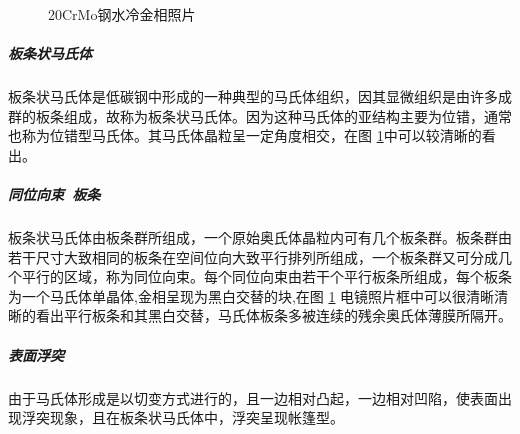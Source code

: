 \documentclass[12pt]{ctexart}
\begin{document}
\begin{figure}[h]
  \centering
  \caption{20CrMo钢水冷金相照片}
  \label{20water}
\end{figure}
\subparagraph{板条状马氏体}
板条状马氏体是低碳钢中形成的一种典型的马氏体组织，因其显微组织是由许多成群的板条组成，故称为板条状马氏体。因为这种马氏体的亚结构主要为位错，通常也称为位错型马氏体。其马氏体晶粒呈一定角度相交，在图 \ref{20water}中可以较清晰的看出。
\subparagraph{同位向束\  板条}
板条状马氏体由板条群所组成，一个原始奥氏体晶粒内可有几个板条群。板条群由若干尺寸大致相同的板条在空间位向大致平行排列所组成，一个板条群又可分成几个平行的区域，称为同位向束。每个同位向束由若干个平行板条所组成，每个板条为一个马氏体单晶体,金相呈现为黑白交替的块,在图 \ref{20water} 电镜照片框中可以很清晰清晰的看出平行板条和其黑白交替，马氏体板条多被连续的残余奥氏体薄膜所隔开。
\subparagraph{表面浮突}
由于马氏体形成是以切变方式进行的，且一边相对凸起，一边相对凹陷，使表面出现浮突现象，且在板条状马氏体中，浮突呈现帐篷型。
\end{document}
